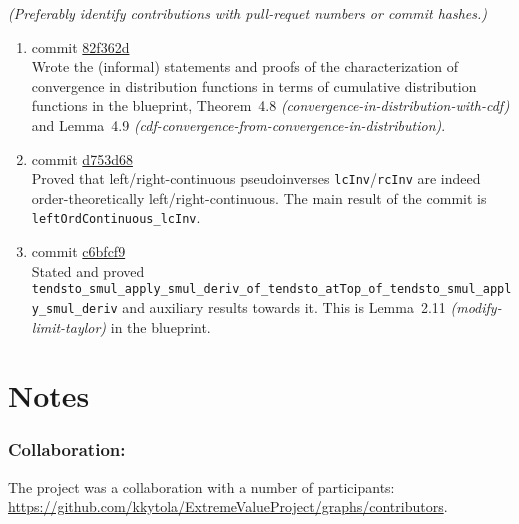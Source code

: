 \documentclass[12pt]{article}
\begin{document}
\hfill{\emph{(Preferably identify contributions with pull-requet numbers or commit hashes.)}}

\begin{enumerate}[label=\arabic*:, leftmargin=1cm]

    \item commit \href{https://github.com/kkytola/ExtremeValueProject/commit/82f362d4812af3a9ccd4260acd3594e318322ea1}{82f362d} \\
    Wrote the (informal) statements and proofs of the characterization of
    convergence in distribution functions in terms of cumulative distribution functions
    in the blueprint,
    Theorem~4.8 \emph{(convergence-in-distribution-with-cdf)} and
    Lemma~4.9 \emph{(cdf-convergence-from-convergence-in-distribution)}.
    
    \item commit \href{https://github.com/kkytola/ExtremeValueProject/commit/d753d68d77e928728d0ef100ff7b706b24e17b26}{d753d68} \\
    Proved that left/right-continuous pseudoinverses \lstinline{lcInv}/\lstinline{rcInv} are indeed order-theoretically
    left/right-continuous. The main result of the commit is \lstinline{leftOrdContinuous_lcInv}.
    
    \item commit \href{https://github.com/kkytola/ExtremeValueProject/commit/c6bfcf913e983d548119998f9eba0ecdcbe3df85}{c6bfcf9} \\ 
    Stated and proved
    \lstinline{tendsto_smul_apply_smul_deriv_of_tendsto_atTop_of_tendsto_smul_apply_smul_deriv}
    and auxiliary results towards it. This is Lemma~2.11 \emph{(modify-limit-taylor)} in the blueprint.

    
\end{enumerate}


\section*{Notes}

\subsubsection*{Collaboration:}
The project was a collaboration with a number of participants:
\url{https://github.com/kkytola/ExtremeValueProject/graphs/contributors}.
\end{document}
